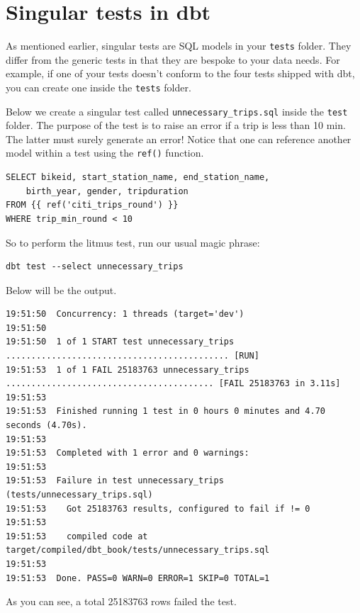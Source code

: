 \documentclass[
]{book}
\begin{document}
\hypertarget{singular-tests-in-dbt}{%
\section{Singular tests in dbt}\label{singular-tests-in-dbt}}

As mentioned earlier, singular tests are SQL models in your \texttt{tests} folder. They differ from the generic tests in that they are bespoke to your data needs. For example, if one of your tests doesn't conform to the four tests shipped with dbt, you can create one inside the \texttt{tests} folder.

Below we create a singular test called \texttt{unnecessary\_trips.sql} inside the \texttt{test} folder. The purpose of the test is to raise an error if a trip is less than 10 min. The latter must surely generate an error! Notice that one can reference another model within a test using the \texttt{ref()} function.

\begin{verbatim}
SELECT bikeid, start_station_name, end_station_name,
    birth_year, gender, tripduration
FROM {{ ref('citi_trips_round') }}
WHERE trip_min_round < 10
\end{verbatim}

So to perform the litmus test, run our usual magic phrase:

\begin{verbatim}
dbt test --select unnecessary_trips
\end{verbatim}

Below will be the output.

\begin{verbatim}
19:51:50  Concurrency: 1 threads (target='dev')
19:51:50  
19:51:50  1 of 1 START test unnecessary_trips ............................................ [RUN]
19:51:53  1 of 1 FAIL 25183763 unnecessary_trips ......................................... [FAIL 25183763 in 3.11s]
19:51:53  
19:51:53  Finished running 1 test in 0 hours 0 minutes and 4.70 seconds (4.70s).
19:51:53  
19:51:53  Completed with 1 error and 0 warnings:
19:51:53  
19:51:53  Failure in test unnecessary_trips (tests/unnecessary_trips.sql)
19:51:53    Got 25183763 results, configured to fail if != 0
19:51:53  
19:51:53    compiled code at target/compiled/dbt_book/tests/unnecessary_trips.sql
19:51:53  
19:51:53  Done. PASS=0 WARN=0 ERROR=1 SKIP=0 TOTAL=1
\end{verbatim}

As you can see, a total 25183763 rows failed the test.
\end{document}
